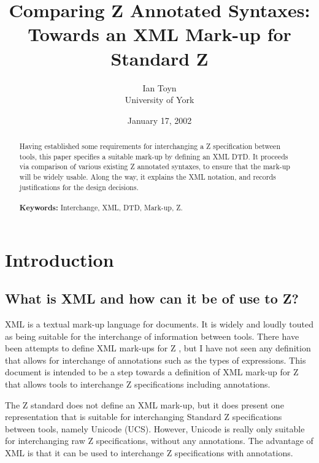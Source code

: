 \documentclass[a4paper,10pt]{article}
\begin{document}
\title{Comparing Z Annotated Syntaxes:\\Towards an XML Mark-up for Standard Z}
\author{Ian Toyn\\University of York}
\date{January 17, 2002}
\maketitle

\begin{abstract}
\noindent Having established some requirements for
interchanging a Z specification between tools,
this paper specifies a suitable mark-up by defining an XML DTD.
It proceeds via comparison of various existing Z annotated syntaxes,
to ensure that the mark-up will be widely usable.
Along the way, it explains the XML notation,
and records justifications for the design decisions.\\
~\\
\noindent\textbf{Keywords:} Interchange, XML, DTD, Mark-up, Z.
\end{abstract}

\section{Introduction}

\subsection{What is XML and how can it be of use to Z?}

XML is a textual mark-up language for documents.
It is widely and loudly touted as being suitable for
the interchange of information between tools.
There have been attempts to define XML mark-ups for Z \cite{Dong01,Wordsworth99},
but I have not seen any definition that allows for
interchange of annotations such as the types of expressions.
This document is intended to be a step towards a definition of XML mark-up
for Z that allows tools to interchange Z specifications including annotations.

The Z standard\cite{ISO13568} does not define an XML mark-up,
but it does present one representation
that is suitable for interchanging Standard Z specifications between tools,
namely Unicode (UCS\cite{ISO10646-1,ISO10646-2}).
However, Unicode is really only suitable for interchanging
raw Z specifications, without any annotations.
The advantage of XML is that it can be used
to interchange Z specifications with annotations.
\end{document}
